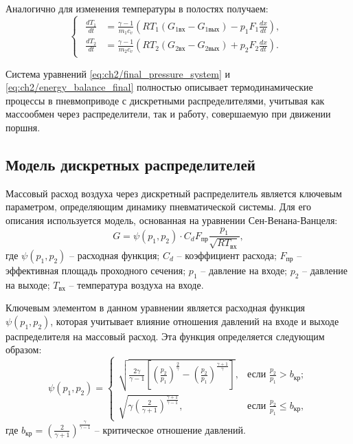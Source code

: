 Аналогично для изменения температуры в полостях получаем:
\begin{equation}
	\label{eq:ch2/energy_balance_final}
	\begin{cases}
		\begin{aligned}
			\frac{dT_1}{dt} & = \frac{\gamma-1}{m_1c_v}\left(RT_1(G_{1\text{вх}} - G_{1\text{вых}}) - p_1F_1\frac{dx}{dt}\right), \\
			\frac{dT_2}{dt} & = \frac{\gamma-1}{m_2c_v}\left(RT_2(G_{2\text{вх}} - G_{2\text{вых}}) + p_2F_2\frac{dx}{dt}\right).
		\end{aligned}
	\end{cases}
\end{equation}

Система уравнений \eqref{eq:ch2/final_pressure_system} и \eqref{eq:ch2/energy_balance_final} полностью
описывает термодинамические процессы в пневмоприводе с дискретными распределителями, учитывая как массообмен
через распределители, так и работу, совершаемую при движении поршня.


\subsection*{Модель дискретных распределителей}
Массовый расход воздуха через дискретный распределитель
является ключевым параметром, определяющим динамику пневматической
системы. Для его описания используется модель, основанная на уравнении Сен-Венана-Ванцеля:
\begin{equation}
	G = \psi(p_1, p_2) \cdot C_d F_\text{пр} \frac{p_1}{\sqrt{RT_\text{вх}}},
\end{equation}
где
$\psi(p_1, p_2)$ -- расходная функция;
$C_d$ -- коэффициент расхода;
$F_\text{пр}$ -- эффективная площадь проходного сечения;
$p_1$ -- давление на входе;
$p_2$ -- давление на выходе;
$T_\text{вх}$ -- температура воздуха на входе.

Ключевым элементом в данном уравнении является расходная функция $\psi(p_1, p_2)$, которая
учитывает влияние отношения давлений на входе и выходе распределителя
на массовый расход. Эта функция определяется следующим образом:
\begin{equation}
	\psi(p_1, p_2) = \begin{cases}
		\sqrt{\frac{2\gamma}{\gamma-1}\left[\left(\frac{p_2}{p_1}\right)^{\frac{2}{\gamma}} - \left(\frac{p_2}{p_1}\right)^{\frac{\gamma+1}{\gamma}}\right]}, & \text{если } \frac{p_2}{p_1} > b_{кр};    \\
		\sqrt{\gamma \left(\frac{2}{\gamma+1}\right)^{\frac{\gamma+1}{\gamma-1}}},                                                                            & \text{если } \frac{p_2}{p_1} \leq b_{кр},
	\end{cases}
\end{equation}
где
$b_{кр} = \left(\frac{2}{\gamma+1}\right)^{\frac{\gamma}{\gamma-1}}$ -- критическое отношение давлений.

